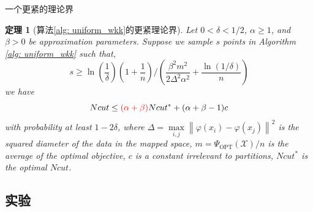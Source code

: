 \documentclass[notheorems]{beamer}
\newcommand{\norm}[1]{\left\lVert#1\right\rVert}
\newtheorem{theorem}{定理}
\begin{document}
\begin{CJK*}{UTF8}{gbsn}
\begin{frame}{一个更紧的理论界}
	\begin{theorem}[算法\ref{alg: uniform_wkk}的更紧理论界]
		Let $0 < \delta <1/2$, $\alpha \geq 1$, and $\beta >0$ be approximation parameters. Suppose we sample $s$ points in Algorithm \ref{alg: uniform_wkk} such that,
		\begin{equation}
		s \geq \ln(\frac{1}{\delta})(1+\frac{1}{n})/(\frac{\beta^2 m^2}{2\Delta^2 \alpha^2}+\frac{\ln(1/\delta)}{n})
		\end{equation}
		we have
		\begin{equation}
		Ncut \leq \textcolor{red}{(\alpha + \beta)} Ncut^* + (\alpha + \beta -1)c
		\end{equation}
		with probability at least $1-2\delta$, where $\Delta = \max\limits_{i,j}\norm{\varphi(x_i) - \varphi(x_j)}^2$ is the squared diameter of the data in the mapped space, $m = \Psi_\text{OPT}(\mathcal{X})/n$ is the average of the optimal objective, $c$ is a constant irrelevant to partitions, $Ncut^*$ is the optimal $Ncut$.
	\end{theorem}
\end{frame}

\subsection{实验}


\end{CJK*}
\end{document}
